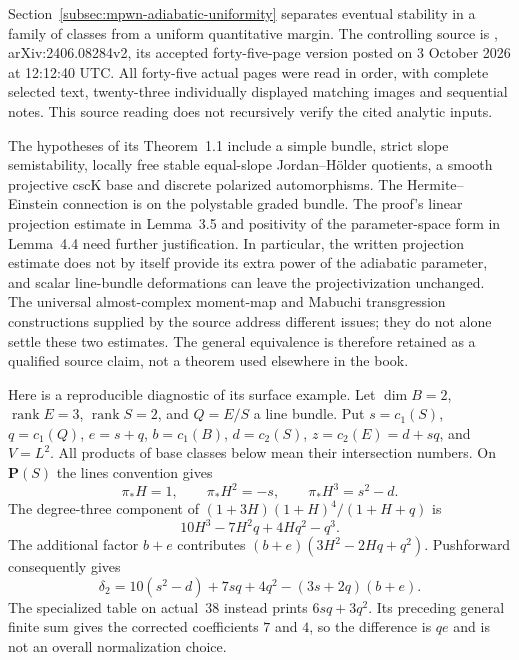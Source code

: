 Section~\ref{subsec:mpwn-adiabatic-uniformity} separates eventual
stability in a family of classes from a uniform quantitative
margin. The controlling source is
\cite{OrtuSektnan24AdiabaticV2}, arXiv:2406.08284v2, its
accepted forty-five-page version posted on 3 October 2026 at
12:12:40 UTC. All forty-five actual pages were read in order,
with complete selected text, twenty-three individually displayed
matching images and sequential notes. This source reading does
not recursively verify the cited analytic inputs.

The hypotheses of its Theorem~1.1 include a simple bundle,
strict slope semistability, locally free stable equal-slope
Jordan--H\"older quotients, a smooth projective cscK base and
discrete polarized automorphisms. The Hermite--Einstein
connection is on the polystable graded bundle. The proof's
linear projection estimate in Lemma~3.5 and positivity of the
parameter-space form in Lemma~4.4 need further justification.
In particular, the written projection estimate does not by
itself provide its extra power of the adiabatic parameter, and
scalar line-bundle deformations can leave the projectivization
unchanged. The universal almost-complex moment-map and Mabuchi
transgression constructions supplied by the source address
different issues; they do not alone settle these two estimates.
The general equivalence is therefore retained as a qualified
source claim, not a theorem used elsewhere in the book.

Here is a reproducible diagnostic of its surface example. Let
$\dim B=2$, $\operatorname{rank}E=3$,
$\operatorname{rank}S=2$, and $Q=E/S$ a line bundle. Put
$s=c_1(S)$, $q=c_1(Q)$, $e=s+q$, $b=c_1(B)$,
$d=c_2(S)$, $z=c_2(E)=d+sq$, and $V=L^2$.
All products of base classes below mean their intersection
numbers. On $\mathbf P(S)$ the lines convention gives
\[
 \pi_*H=1,\qquad \pi_*H^2=-s,\qquad
 \pi_*H^3=s^2-d.
\]
The degree-three component of
$(1+3H)(1+H)^4/(1+H+q)$ is
\[
 10H^3-7H^2q+4Hq^2-q^3.
\]
The additional factor $b+e$ contributes
$(b+e)(3H^2-2Hq+q^2)$. Pushforward consequently gives
\[
 \delta_2=10(s^2-d)+7sq+4q^2-(3s+2q)(b+e).
\]
The specialized table on actual~38 instead prints $6sq+3q^2$.
Its preceding general finite sum gives the corrected coefficients
$7$ and $4$, so the difference is $qe$ and is not an overall
normalization choice.

